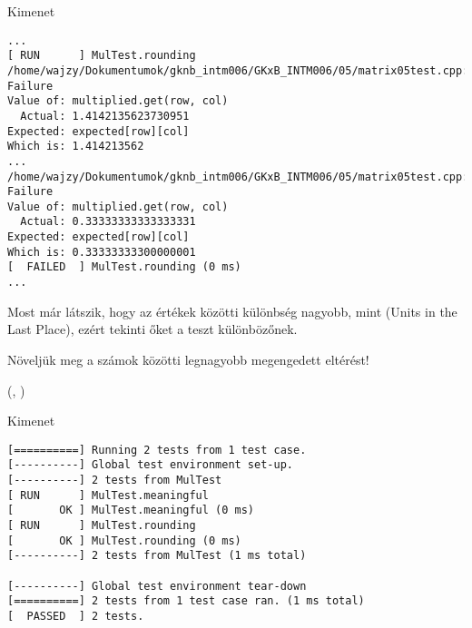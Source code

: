 \begin{frame}[fragile]
  \begin{block}{Kimenet}
    \scriptsize
    \begin{verbatim}
...
[ RUN      ] MulTest.rounding
/home/wajzy/Dokumentumok/gknb_intm006/GKxB_INTM006/05/matrix05test.cpp:50: Failure
Value of: multiplied.get(row, col)
  Actual: 1.4142135623730951
Expected: expected[row][col]
Which is: 1.414213562
...
/home/wajzy/Dokumentumok/gknb_intm006/GKxB_INTM006/05/matrix05test.cpp:50: Failure
Value of: multiplied.get(row, col)
  Actual: 0.33333333333333331
Expected: expected[row][col]
Which is: 0.33333333300000001
[  FAILED  ] MulTest.rounding (0 ms)
...
\end{verbatim}
  \end{block}
  Most már látszik, hogy az értékek közötti különbség nagyobb, mint %
  (Units in the Last Place), ezért tekinti őket a teszt különbözőnek.
\end{frame}

\begin{frame}
  Növeljük meg a számok közötti legnagyobb megengedett eltérést!
  \begin{exampleblock}{ %
    (, %
     )}
    \footnotesize
    
  \end{exampleblock}
\end{frame}

\begin{frame}[fragile]
  \begin{block}{Kimenet}
    \scriptsize
    \begin{verbatim}
[==========] Running 2 tests from 1 test case.
[----------] Global test environment set-up.
[----------] 2 tests from MulTest
[ RUN      ] MulTest.meaningful
[       OK ] MulTest.meaningful (0 ms)
[ RUN      ] MulTest.rounding
[       OK ] MulTest.rounding (0 ms)
[----------] 2 tests from MulTest (1 ms total)

[----------] Global test environment tear-down
[==========] 2 tests from 1 test case ran. (1 ms total)
[  PASSED  ] 2 tests.
\end{verbatim}
  \end{block}
\end{frame}


